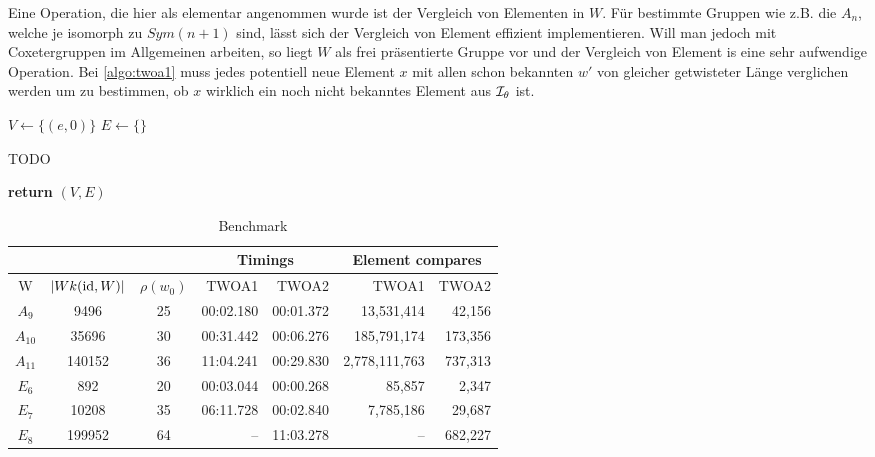 Eine Operation, die hier als elementar angenommen wurde ist der Vergleich von
Elementen in $W$. Für bestimmte Gruppen wie z.B. die $A_n$, welche je isomorph
zu $Sym(n+1)$ sind, lässt sich der Vergleich von Element effizient
implementieren. Will man jedoch mit Coxetergruppen im Allgemeinen arbeiten, so
liegt $W$ als frei präsentierte Gruppe vor und der Vergleich von Element is eine
sehr aufwendige Operation. Bei \ref{algo:twoa1} muss jedes
potentiell neue Element $x$ mit allen schon bekannten $w'$ von gleicher
getwisteter Länge verglichen werden um zu bestimmen, ob $x$ wirklich ein noch
nicht bekanntes Element aus $\mathcal{I}_{\theta}$ ist.

\begin{algo}[Algorithmus 2]
	\hfill
	\begin{algorithmic}[1]
	 
	\State $V \gets \{(e,0)\}$
	\State $E \gets \{\}$

		\State TODO
	\EndFor

	\State \textbf{return} $(V,E)$
	\EndProcedure
	\end{algorithmic}
\end{algo}

\begin{table}
	\centering
	\begin{tabular}{|c|c|c|r|r|r|r|}
	\hline
	\multicolumn{3}{|c|}{} & \multicolumn{2}{|c|}{Timings} &
	\multicolumn{2}{|c|}{Element compares}\\
	\hline
	W & $|Wk(\operatorname{id},W)|$ & $\rho(w_0)$ & TWOA1 & TWOA2 & TWOA1 & TWOA2\\
	\hline
	$A_9$ & 9496 & 25 & 00:02.180 & 00:01.372 & 13,531,414 & 42,156\\
	\hline
	$A_{10}$ & 35696 & 30 & 00:31.442 & 00:06.276 & 185,791,174 & 173,356\\
	\hline
	$A_{11}$ & 140152 & 36 & 11:04.241 & 00:29.830 & 2,778,111,763 & 737,313\\
	\hline
	$E_6$ & 892 & 20 & 00:03.044 & 00:00.268 & 85,857 & 2,347\\
	\hline
	$E_7$ & 10208 & 35 & 06:11.728 & 00:02.840 & 7,785,186 & 29,687\\
	\hline
	$E_8$ & 199952 & 64 & -- & 11:03.278 & -- & 682,227\\
	\hline
	\end{tabular}
	\caption{Benchmark}
	\label{tab:benchmark-twoa}
\end{table}

